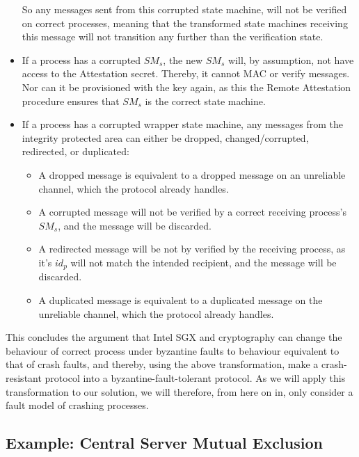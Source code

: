 \documentclass{article}
\begin{document}
\begin{itemize}
		So any messages sent from this corrupted state machine, will not be verified on correct processes, meaning that the transformed state machines receiving this message will not transition any further than the verification state.
		\item If a process has a corrupted $SM_s$, the new $SM_s$ will, by assumption, not have access to the Attestation secret.
		Thereby, it cannot MAC or verify messages.
		Nor can it be provisioned with the key again, as this the Remote Attestation procedure ensures that $SM_s$ is the correct state machine.
		\item If a process has a corrupted wrapper state machine, any messages from the integrity protected area can either be dropped, changed/corrupted, redirected, or duplicated:
		\begin{itemize}
			\item A dropped message is equivalent to a dropped message on an unreliable channel, which the protocol already handles.
			\item A corrupted message will not be verified by a correct receiving process's $SM_s$, and the message will be discarded.
			\item A redirected message will be not by verified by the receiving process, as it's $id_p$ will not match the intended recipient, and the message will be discarded.
			\item A duplicated message is equivalent to a duplicated message on the unreliable channel, which the protocol already handles.
		\end{itemize}
	\end{itemize}

	This concludes the argument that Intel SGX and cryptography can change the behaviour of correct process under byzantine faults to behaviour equivalent to that of crash faults, and thereby, using the above transformation, make a crash-resistant protocol into a byzantine-fault-tolerant protocol.
	As we will apply this transformation to our solution, we will therefore, from here on in, only consider a fault model of crashing processes.

		\subsection{Example: Central Server Mutual Exclusion}
\end{document}
